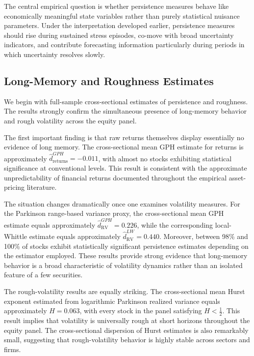 \documentclass[unnumsec,webpdf,contemporary,large]{oup-authoring-template}%
\theoremstyle{thmstyleone}%
\theoremstyle{thmstyletwo}%
\theoremstyle{thmstylethree}%
\begin{document}
The central empirical question is whether persistence measures behave like
economically meaningful state variables rather than purely statistical
nuisance parameters. Under the interpretation developed earlier, persistence
measures should rise during sustained stress episodes, co-move with broad
uncertainty indicators, and contribute forecasting information particularly
during periods in which uncertainty resolves slowly.

\subsection{Long-Memory and Roughness Estimates}

We begin with full-sample cross-sectional estimates of persistence and
roughness. The results strongly confirm the simultaneous presence of
long-memory behavior and rough volatility across the equity panel.

The first important finding is that raw returns themselves display
essentially no evidence of long memory. The cross-sectional mean GPH
estimate for returns is approximately $ \hat{d}^{GPH}_{\mathrm{returns}}
= -0.011$, with almost no stocks exhibiting statistical significance at
conventional levels. This result is consistent with the approximate
unpredictability of financial returns documented throughout the empirical
asset-pricing literature.

The situation changes dramatically once one examines volatility measures.
For the Parkinson range-based variance proxy, the cross-sectional mean GPH
estimate equals approximately $ \hat{d}^{GPH}_{\mathrm{RV}} = 0.226$, while
the corresponding local-Whittle estimate equals approximately
$ \hat{d}^{LW}_{\mathrm{RV}} = 0.440$. Moreover, between 98\% and 100\% of
stocks exhibit statistically significant persistence estimates depending on
the estimator employed. These results provide strong evidence that
long-memory behavior is a broad characteristic of volatility dynamics
rather than an isolated feature of a few securities.

The rough-volatility results are equally striking. The cross-sectional
mean Hurst exponent estimated from logarithmic Parkinson realized variance
equals approximately $H = 0.063$, with every stock in the panel satisfying
$H < \frac{1}{2}$. This result implies that volatility is universally rough
at short horizons throughout the equity panel. The cross-sectional
dispersion of Hurst estimates is also remarkably small, suggesting that
rough-volatility behavior is highly stable across sectors and firms.
\end{document}
